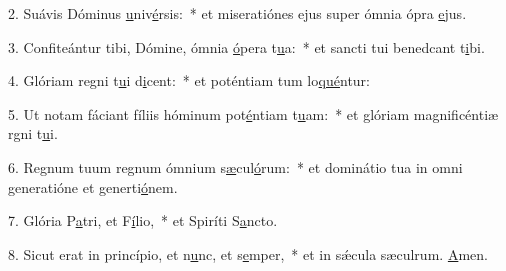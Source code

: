2. Suávis Dóminus \uline{u}niv\uline{é}rsis:~* et miseratiónes ejus super ómnia ópra \uline{e}jus.\par 
3. Confiteántur tibi, Dómine, ómnia \uline{ó}pera t\uline{u}a:~* et sancti tui benedcant t\uline{i}bi.\par 
4. Glóriam regni t\uline{u}i d\uline{i}cent:~* et poténtiam tum lo\uline{qué}ntur:\par 
5. Ut notam fáciant fíliis hóminum pot\uline{é}ntiam t\uline{u}am:~* et glóriam magnificéntiæ rgni t\uline{u}i.\par 
6. Regnum tuum regnum ómnium s\uline{æ}cul\uline{ó}rum:~* et dominátio tua in omni generatióne et generti\uline{ó}nem.\par 
7. Glória P\uline{a}tri, et F\uline{í}lio,~* et Spiríti S\uline{a}ncto.\par 
8. Sicut erat in princípio, et n\uline{u}nc, et s\uline{e}mper,~* et in sǽcula sæculrum. \uline{A}men.\par 
